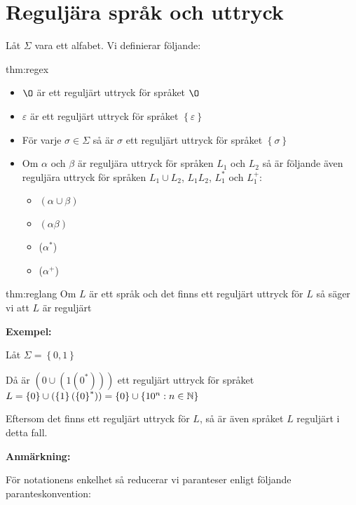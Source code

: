 \section{Reguljära språk och uttryck}
\par\bigskip
\noindent Låt $\Sigma$ vara ett alfabet. Vi definierar följande:
\par\bigskip
\begin{theo}{thm:regex}
  \begin{itemize}
    \item $\O$ är ett reguljärt uttryck för språket $\O$
    \item $\varepsilon$ är ett reguljärt uttryck för språket $\left\{\varepsilon\right\}$
    \item För varje $\sigma\in\Sigma$ så är $\sigma$ ett reguljärt uttryck för språket $\left\{\sigma\right\}$
    \item Om $\alpha$ och $\beta$ är reguljära uttryck för språken $L_1$ och $L_2$ så är följande även reguljära uttryck för språken $L_1\cup L_2$, $L_1L_2$, $L_1^*$ och $L_1^+$:
    \begin{itemize}
      \item $(\alpha\cup\beta)$
      \item $(\alpha\beta)$
      \item ($\alpha^*$)
      \item ($\alpha^+$)
    \end{itemize}
  \end{itemize}
\end{theo}
\par\bigskip
\begin{theo}{thm:reglang}
  Om $L$ är ett språk och det finns ett reguljärt uttryck för $L$ så säger vi att $L$ är reguljärt
\end{theo}
\par\bigskip
\noindent\textbf{Exempel:}\par
\noindent Låt $\Sigma = \left\{0,1\right\}$\par
\noindent Då är $(0\cup(1(0^*)))$ ett reguljärt uttryck för språket $L = \left\{0\right\}\cup(\left\{1\right\}(\left\{0\right\}^*)) = \left\{0\right\}\cup\left\{10^n:n\in\mathbb{N}\right\}$\par
\noindent Eftersom det finns ett reguljärt uttryck för $L$, så är även språket $L$ reguljärt i detta fall.
\par\bigskip
\noindent\textbf{Anmärkning:}\par
\noindent För notationens enkelhet så reducerar vi paranteser enligt följande paranteskonvention:\par
